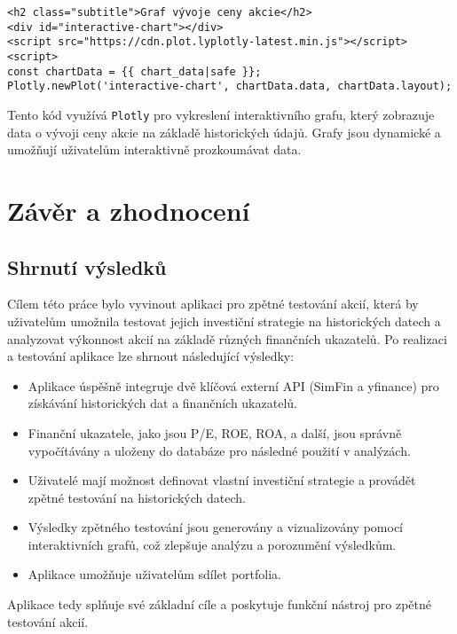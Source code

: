\documentclass[12pt, a4paper]{report}
\begin{document}
\begin{lstlisting}[style=Python, caption= Grafy] 
<h2 class="subtitle">Graf vývoje ceny akcie</h2>
<div id="interactive-chart"></div>
<script src="https://cdn.plot.lyplotly-latest.min.js"></script>
<script>
const chartData = {{ chart_data|safe }};
Plotly.newPlot('interactive-chart', chartData.data, chartData.layout);
\end{lstlisting}

Tento kód využívá \texttt{Plotly} pro vykreslení interaktivního grafu, který zobrazuje data o vývoji ceny akcie na základě historických údajů. Grafy jsou dynamické a umožňují uživatelům interaktivně prozkoumávat data.



\chapter{Závěr a zhodnocení}


\section{Shrnutí výsledků}


Cílem této práce bylo vyvinout aplikaci pro zpětné testování akcií, která by uživatelům umožnila testovat jejich investiční strategie na historických datech a analyzovat výkonnost akcií na základě různých finančních ukazatelů. Po realizaci a testování aplikace lze shrnout následující výsledky:

\begin{itemize}
    \item Aplikace úspěšně integruje dvě klíčová externí API (SimFin a yfinance) pro získávání historických dat a finančních ukazatelů.
    \item Finanční ukazatele, jako jsou P/E, ROE, ROA, a další, jsou správně vypočítávány a uloženy do databáze pro následné použití v analýzách.
    \item Uživatelé mají možnost definovat vlastní investiční strategie a provádět zpětné testování na historických datech.
    \item Výsledky zpětného testování jsou generovány a vizualizovány pomocí interaktivních grafů, což zlepšuje analýzu a porozumění výsledkům.
    \item Aplikace umožňuje uživatelům sdílet portfolia.
\end{itemize}

Aplikace tedy splňuje své základní cíle a poskytuje funkční nástroj pro zpětné testování akcií.
\end{document}
